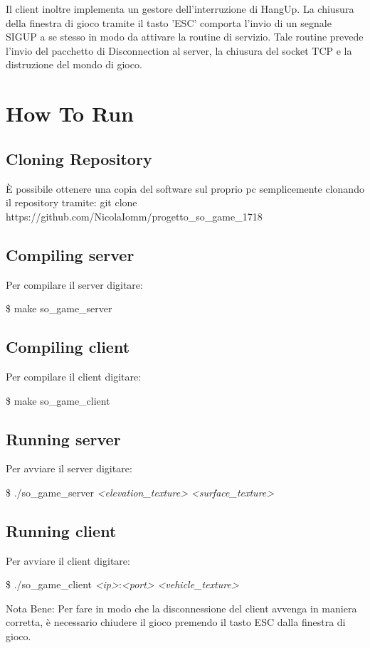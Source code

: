 \documentclass{article}
\begin{document}
Il client inoltre implementa un gestore dell'interruzione di HangUp.
La chiusura della finestra di gioco tramite il tasto 'ESC' comporta l'invio di un segnale SIGUP a se stesso in modo da attivare la routine di servizio. Tale routine prevede l'invio del pacchetto di Disconnection al server, la chiusura del socket TCP e la distruzione del mondo di gioco. 

\section*{How To Run}
\subsection*{Cloning Repository}
È possibile ottenere una copia del software sul proprio pc semplicemente clonando il repository tramite:
	git clone https://github.com/NicolaIomm/progetto\_so\_game\_1718

\subsection*{Compiling server}
Per compilare il server digitare:
\begin{center}\$ make so\_game\_server \end{center}

\subsection*{Compiling client}
Per compilare il client digitare:
\begin{center}\$ make so\_game\_client \end{center}

\subsection*{Running server}
Per avviare il server digitare:
\begin{center}\$ ./so\_game\_server \textit{<elevation\_texture>} \textit{<surface\_texture>}\end{center}
	
\subsection*{Running client}
Per avviare il client digitare:
\begin{center}\$ ./so\_game\_client \textit{<ip>}:\textit{<port>} \textit{<vehicle\_texture>}\end{center}

Nota Bene: Per fare in modo che la disconnessione del client avvenga in maniera corretta, è necessario chiudere il gioco premendo il tasto ESC dalla finestra di gioco.

\end{document}
